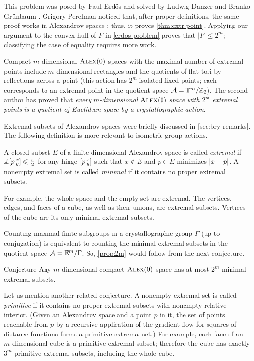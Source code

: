 This problem was posed by Paul Erdős \cite{erdos} and solved by Ludwig Danzer and Branko Grünbaum \cite{danzer-gruenbaum}.
Grigory Perelman noticed that, after proper definitions, the same proof works in Alexandrov spaces \cite{perelman-Erdos}; thus, it proves \ref{thm:extr-point}.
Applying our argument to the convex hull of $F$ in \ref{erdos-problem} proves that $|F|\le 2^m$;
classifying the case of equality requires more work.

Compact $m$-dimensional $\textup{\textsc{Alex}}(0)$ spaces with the maximal number of extremal points include $m$-dimensional rectangles and the quotients of flat tori by reflections across a point
(this action has $2^m$ isolated fixed points; each corresponds to an extremal point in the quotient space $\mathcal{A}=\mathbb{T}^m/\mathbb{Z}_2$).
The second author has proved \cite{lebedeva2015} that \textit{every $m$-dimensional $\textup{\textsc{Alex}}(0)$ space with $2^m$ extremal points is a quotient of Euclidean space by a crystallographic action}.

Extremal subsets of Alexandrov spaces were briefly discussed in \ref{sec:bry-remarks}.
The following definition is more relevant to isometric group actions.

A closed subset $E$ of a finite-dimensional Alexandrov space is called
\emph{extremal} if $\mangle\hinge pxy\z\le \tfrac\pi2$ for any hinge $[p\,{}^{x}_{y}]$ such that $x\notin E$ and $p\in E$ minimizes $\dist{x}{p}{}$.
A nonempty extremal set is called \emph{minimal} if it contains no proper extremal subsets.

For example, the whole space and the empty set are extremal.
The vertices, edges, and faces of a cube, as well as their unions, are extremal subsets.
Vertices of the cube are its only minimal extremal subsets.

Counting maximal finite subgroups in a crystallographic group $\Gamma$ (up to conjugation) is equivalent to counting the minimal extremal subsets in the quotient space $\mathcal{A}=\mathbb{E}^m/\Gamma$.
So, \ref{prop:2m} would follow from the next conjecture.

\begin{thm}{Conjecture}
Any $m$-dimensional compact $\textup{\textsc{Alex}}(0)$ space has at most $2^m$ minimal extremal subsets.
\end{thm}

Let us mention another related conjecture.
A nonempty extremal set is called \emph{primitive} if it contains no proper extremal subsets with nonempty relative interior.
(Given an Alexandrov space and a point $p$ in it, the set of points reachable from $p$ by a recursive application of the gradient flow for squares of distance functions forms a primitive extremal set.)
For example, each face of an $m$-dimensional cube is a primitive extremal subset;
therefore the cube has exactly $3^m$ primitive extremal subsets, including the whole cube.

